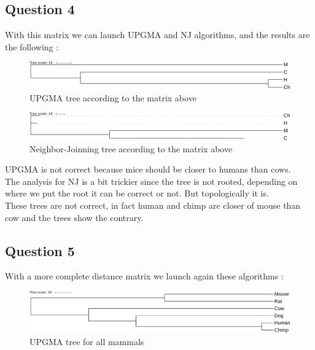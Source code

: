 \documentclass[]{article}
\theoremstyle{definition}
\begin{document}
\subsection{Question 4}


With this matrix we can launch UPGMA and NJ algorithms, and the results are the following :
 
\begin{figure}[h!]

	\includegraphics*[width = \linewidth]{../UPGMA1.pdf}
	\caption{\label{upgma1} UPGMA tree according to the matrix above }
\end{figure}


\begin{figure}[h!!]
	\includegraphics*[width = \linewidth]{../NJ1.pdf}
	\caption{\label{nj1} Neighbor-Joinning tree according to the matrix above }
\end{figure}


UPGMA is not correct because mice should be closer to humans than cows.\\
The analysis for NJ is a bit trickier since the tree is not rooted, depending on where we put the root it can be correct or not. But topologically it is.\\
These trees are not correct, in fact human and chimp are closer of mouse than cow and the trees show the contrary. 

\subsection{Question 5}

With a more complete distance matrix we launch again these algorithms :

\begin{figure}[h!]
	\includegraphics*[width = \linewidth]{../files/UPGMA.pdf}
	\caption{\label{upgma2} UPGMA tree for all mammals }
\end{figure}
\end{document}
